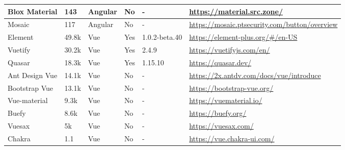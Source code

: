 \begin{table*}[t]
\begin{tabularx}{\textwidth}{p{} |p{} | p{} | p{} | p{} |p{}  }
    Blox Material           & 143                     & Angular               & No                & -                & \url{https://material.src.zone/}                                                 \\ \hline
    Mosaic                  & 117                     & Angular               & No                & -                & \url{https://mosaic.ptsecurity.com/button/overview }                             \\ \hline
    Element                 & 49.8k                   & Vue                   & Yes               & 1.0.2-beta.40    & \url{https://element-plus.org/\#/en-US}                                          \\ \hline
    Vuetify                 & 30.2k                   & Vue                   & Yes               & 2.4.9            & \url{https://vuetifyjs.com/en/}                                                  \\ \hline
    Quasar                  & 18.3k                   & Vue                   & Yes               & 1.15.10          & \url{https://quasar.dev/ }                                                       \\ \hline
    Ant Design Vue          & 14.1k                   & Vue                   & No                & -                & \url{https://2x.antdv.com/docs/vue/introduce }                                   \\ \hline
    Bootstrap Vue           & 13.1k                   & Vue                   & No                & -                & \url{https://bootstrap-vue.org/ }                                                \\ \hline
    Vue-material            & 9.3k                    & Vue                   & No                & -                & \url{https://vuematerial.io/ }                                                   \\ \hline
    Buefy                   & 8.6k                    & Vue                   & No                & -                & \url{https://buefy.org/ }                                                        \\ \hline
    Vuesax                  & 5k                      & Vue                   & No                & -                & \url{https://vuesax.com/ }                                                       \\ \hline
    Chakra                  & 1.1                     & Vue                   & No                & -                & \url{https://vue.chakra-ui.com/ }                                                \\ \hline

\end{tabularx}
\end{table*}
